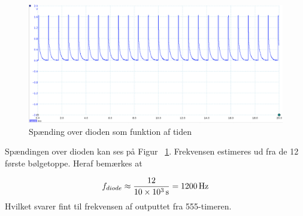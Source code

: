 \begin{figure}[H]
	\centering
    \includegraphics[width=13cm]{figures/2_4_3hastighed/555timerDiode.png}
	\caption{Spænding over dioden som funktion af tiden}
	\label{fig:diodeafsender}
\end{figure}
Spændingen over dioden kan ses på Figur ~\ref{fig:diodeafsender}.
Frekvensen estimeres ud fra de 12 første bølgetoppe. Heraf bemærkes at 

\[
	f_{diode} \approx \frac{12}{\SI{10d3}{s}} = \SI{1200}{Hz}
\]
Hvilket svarer fint til frekvensen af outputtet fra 555-timeren.

